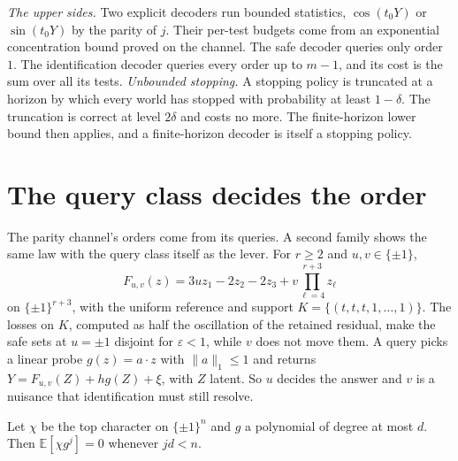 
\emph{The upper sides.} Two explicit decoders run bounded statistics, $\cos(t_{0}Y)$ or
$\sin(t_{0}Y)$ by the parity of $j$. Their per-test budgets come from an exponential
concentration bound proved on the channel. The safe decoder queries only order $1$. The
identification decoder queries every order up to $m-1$, and its cost is the sum over all its
tests. \emph{Unbounded stopping.} A stopping policy is truncated at a horizon by which every
world has stopped with probability at least $1-\delta$. The truncation is correct at level
$2\delta$ and costs no more. The finite-horizon lower bound then applies, and a finite-horizon
decoder is itself a stopping policy.


\section{The query class decides the order}
\label{sec:family}

The parity channel's orders come from its queries. A second family shows the same law with the
query class itself as the lever. For $r\ge2$ and $u,v\in\{\pm1\}$,
\[
F_{u,v}(z)=3uz_{1}-2z_{2}-2z_{3}+v\prod_{\ell=4}^{r+3}z_{\ell}
\]
on $\{\pm1\}^{r+3}$, with the uniform reference and support
$K=\{(t,t,t,1,\dots,1)\}$. The losses on $K$, computed as half the oscillation of the retained
residual, make the safe sets at $u=\pm1$ disjoint for $\varepsilon<1$, while $v$ does not move
them. \CERT{} A query picks a linear probe $g(z)=a\cdot z$ with $\|a\|_{1}\le1$ and returns
$Y=F_{u,v}(Z)+hg(Z)+\xi$, with $Z$ latent. So $u$ decides the answer and $v$ is a nuisance that
identification must still resolve.

\begin{theorem}
\label{thm:vanish}
Let $\chi$ be the top character on $\{\pm1\}^{n}$ and $g$ a polynomial of degree at most $d$.
Then $\mathbb{E}[\chi g^{j}]=0$ whenever $jd<n$.
\end{theorem}


